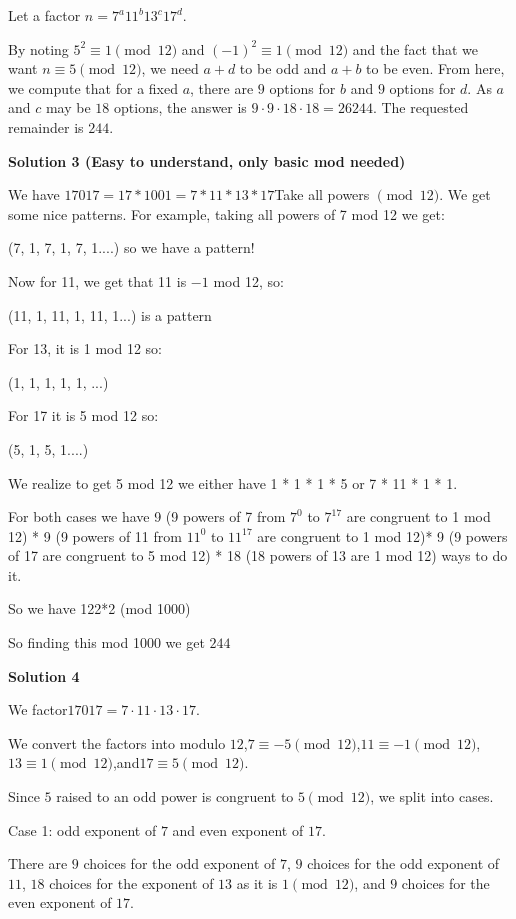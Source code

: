 \begin{enumerate}
 Let a factor $n=7^a11^b13^c17^d$.

 By noting $5^2\equiv1\pmod{12}$ and $(-1)^2\equiv1\pmod{12}$ and the fact that we want $n\equiv5\pmod{12}$, we need $a+d$ to be odd and $a+b$ to be even. From here, we compute that for a fixed $a$, there are $9$ options for $b$ and $9$ options for $d$. As $a$ and $c$ may be $18$ options, the answer is $9\cdot9\cdot18\cdot18=26244$. The requested remainder is $244$.

 



\textbf{Solution 3 (Easy to understand, only basic mod needed)}

We have $17017  = 17 * 1001 = 7 * 11 * 13 * 17$Take all powers $\pmod{ 12}$. We get some nice patterns. For example, taking all powers of 7 mod 12 we get:

 (7, 1, 7, 1, 7, 1....) so we have a pattern!

 Now for 11, we get that 11 is $-1$ mod 12, so:

 (11, 1, 11, 1, 11, 1...) is a pattern

 For 13, it is 1 mod 12 so:

 (1, 1, 1, 1, 1, ...)

 For 17 it is 5 mod 12 so:

 (5, 1, 5, 1....)

 We realize to get 5 mod 12 we either have 1 * 1 * 1 * 5 or 7 * 11 * 1 * 1.

 For both cases we have 9 (9 powers of 7 from $7^0$ to $7^{17}$ are congruent to 1 mod 12) * 9 (9 powers of 11 from $11^0$ to $11^{17}$ are congruent to 1 mod 12)* 9 (9 powers of 17 are congruent to 5 mod 12) * 18 (18 powers of 13 are 1 mod 12) ways to do it.

 So we have 122*2 (mod 1000)

 So finding this mod 1000 we get $\boxed{244}$




\textbf{Solution 4}

We factor$17017 = 7 \cdot 11 \cdot 13 \cdot 17$.

 We convert the factors into modulo $12$,$7 \equiv -5 \pmod{12}$,$11 \equiv -1 \pmod{12}$,$13 \equiv 1 \pmod{12}$,and$17 \equiv 5 \pmod{12}$.

 
Since $5$ raised to an odd power is congruent to $5 \pmod{12}$, we split into cases.

 
Case 1: odd exponent of $7$ and even exponent of $17$.

 
There are $9$ choices for the odd exponent of $7$, $9$ choices for the odd exponent of $11$, $18$ choices for the exponent of $13$ as it is $1 \pmod{12}$, and $9$ choices for the even exponent of $17$.


\end{enumerate}
